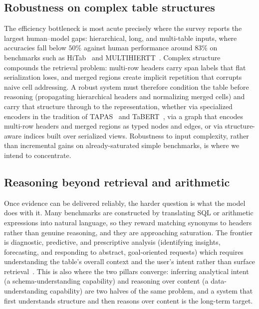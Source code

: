 \subsection{Robustness on complex table structures}
The efficiency bottleneck is most acute precisely where the survey reports the largest human--model gaps: hierarchical, long, and multi-table inputs, where accuracies fall below $50\%$ against human performance around $83\%$ on benchmarks such as HiTab~\cite{cheng2022hitab} and MULTIHIERTT~\cite{zhao2022multihiertt}. Complex structure compounds the retrieval problem: multi-row headers carry span labels that flat serialization loses, and merged regions create implicit repetition that corrupts naive cell addressing. A robust system must therefore condition the table before reasoning (propagating hierarchical headers and normalizing merged cells) and carry that structure through to the representation, whether via specialized encoders in the tradition of TAPAS~\cite{herzig2020tapas} and TaBERT~\cite{yin2020tabert}, via a graph that encodes multi-row headers and merged regions as typed nodes and edges, or via structure-aware indices built over serialized views. Robustness to input complexity, rather than incremental gains on already-saturated simple benchmarks, is where we intend to concentrate.

\subsection{Reasoning beyond retrieval and arithmetic}
Once evidence can be delivered reliably, the harder question is what the model does with it. Many benchmarks are constructed by translating SQL or arithmetic expressions into natural language, so they reward matching synonyms to headers rather than genuine reasoning, and they are approaching saturation. The frontier is diagnostic, predictive, and prescriptive analysis (identifying insights, forecasting, and responding to abstract, goal-oriented requests) which requires understanding the table's overall context and the user's intent rather than surface retrieval~\cite{lei2024spider2,he2024text2analysis}. This is also where the two pillars converge: inferring analytical intent (a schema-understanding capability) and reasoning over content (a data-understanding capability) are two halves of the same problem, and a system that first understands structure and then reasons over content is the long-term target.

